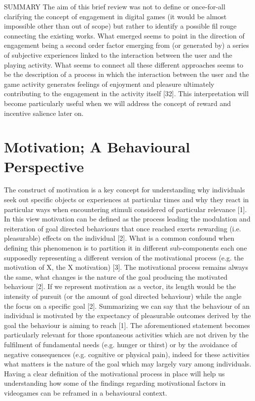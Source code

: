 SUMMARY
The aim of this brief review was not to define or once-for-all clarifying the concept of engagement in digital games (it would be almost impossible other than out of scope) but rather to identify a possible fil rouge connecting the existing works. What emerged seems to point in the direction of engagement being a second order factor emerging from (or generated by) a series of subjective experiences linked to the interaction between the user and the playing activity. What seems to connect all these different approaches seems to be the description of a process in which the interaction between the user and the game activity generates feelings of enjoyment and pleasure ultimately contributing to the engagement in the activity itself [32]. This interpretation will become particularly useful when we will address the concept of reward and incentive salience later on.

\section{Motivation; A Behavioural Perspective}
\label{motivation}

The construct of motivation is a key concept for understanding why individuals seek out specific objects or experiences at particular times and why they react in particular ways when encountering stimuli considered of particular relevance [1]. In this view motivation can be defined as the process leading the modulation and reiteration of goal directed behaviours that once reached exerts rewarding (i.e. pleasurable) effects on the individual [2]. What is a common confound when defining this phenomenon is to partition it in different sub-components each one supposedly representing a different version of the motivational process (e.g. the motivation of X, the X motivation) [3]. The motivational process remains always the same, what changes is the nature of the goal producing the motivated behaviour [2]. If we represent motivation as a vector, its length would be the intensity of pursuit (or the amount of goal directed behaviour) while the angle the focus on a specific goal [2]. Summarizing we can say that the behaviour of an individual is motivated by the expectancy of pleasurable outcomes derived by the goal the behaviour is aiming to reach [1]. The aforementioned statement becomes particularly relevant for those spontaneous activities which are not driven by the fulfilment of fundamental needs (e.g. hunger or thirst) or by the avoidance of negative consequences (e.g. cognitive or physical pain), indeed for these activities what matters is the nature of the goal which may largely vary among individuals. Having a clear definition of the motivational process in place will help us understanding how some of the findings regarding motivational factors in videogames can be reframed in a behavioural context.


